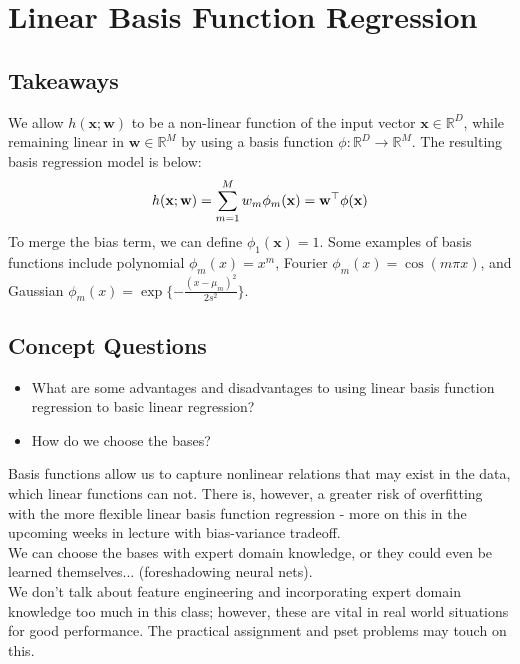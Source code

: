 \documentclass[11pt,letterpaper]{article}
\begin{document}
\section{Linear Basis Function Regression}
\subsection{Takeaways}
We allow $h(\mathbf{x};\mathbf{w})$ to be a non-linear function of the input vector $\mathbf{x} \in \mathbb{R}^D$, while remaining linear in $\mathbf{w} \in \mathbb{R}^M$ by using a basis function $\phi : \mathbb{R}^D \to \mathbb{R}^M$. The resulting basis regression model is below:
\begin{align}
    h(\mathbf{x};\mathbf{w})= \sum_{m = 1}^{M}w_m \phi_m(\mathbf{x})
    =\mathbf{w}^\top\mathbf{\mathbf{\phi}}(\mathbf{x})
\end{align}
To merge the bias term, we can define $\phi_1(\mathbf{x})=1$. Some examples of basis functions include polynomial $\phi_m(x) = x^m$, Fourier $\phi_m(x) = \cos( m \pi x )$, and Gaussian $\phi_m(x) = \exp \{- \frac{(x - \mu_m)^2}{2s^2}\}$.

\subsection{Concept Questions}
\begin{itemize}
    \item What are some advantages and disadvantages to using linear basis function regression to basic linear regression? 
    \item How do we choose the bases?
\end{itemize}

\noindent Basis functions allow us to capture nonlinear relations that may exist in the data, which linear functions can not. There is, however, a greater risk of overfitting with the more flexible linear basis function regression - more on this in the upcoming weeks in lecture with bias-variance tradeoff.\\

\noindent We can choose the bases with expert domain knowledge, or they could even be learned themselves... (foreshadowing neural nets).\\

\noindent We don't talk about feature engineering and incorporating expert domain knowledge too much in this class; however, these are vital in real world situations for good performance. The practical assignment and pset problems may touch on this.
\end{document}
